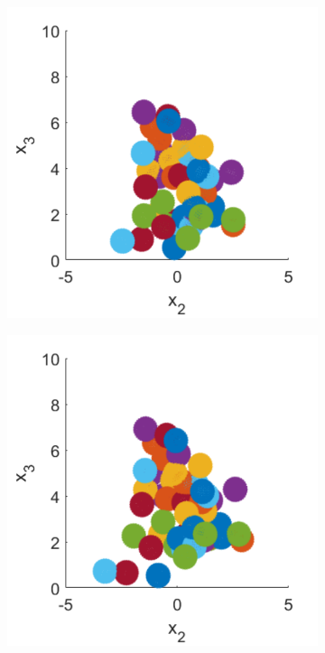 \begin{figure}
\begin{subfigure}[b]{0.2\textwidth}
    \caption[]{\label{fig:squirmerPosB}}
\end{subfigure}
\begin{subfigure}[b]{0.2\textwidth}
    \centering
    \includegraphics[width=\textwidth]{Images/squirmers/Gyro-3-All.pdf}
    \caption[]{\label{fig:squirmerPosC}}
\end{subfigure}
\begin{subfigure}[b]{0.2\textwidth}
    \centering
    \includegraphics[width=\textwidth]{Images/squirmers/Gyro-4-All.pdf}

\end{subfigure}
\end{figure}
